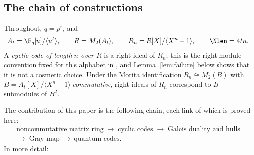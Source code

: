 \subsection{The chain of constructions}

Throughout, $q=p^r$, and
\[
  A_t=\F_q[u]/\langle u^t\rangle,\qquad
  R=M_2(A_t),\qquad
  R_n=R[X]/\langle X^n-1\rangle,\qquad
  \Nlen=4tn .
\]
A \emph{cyclic code of length $n$ over $R$} is a right ideal of $R_n$; this is
the right-module convention fixed for this alphabet in
\cite{Alahmadi2013CyclicM2F2}, and Lemma~\ref{lem:failure} below shows that it
is not a cosmetic choice. Under the Morita identification $R_n\cong M_2(B)$ with
$B=A_t[X]/\langle X^n-1\rangle$ \emph{commutative}, right ideals of $R_n$
correspond to $B$-submodules of $B^2$.

The contribution of this paper is the following chain, each link of which is
proved here:
\[
  \begin{gathered}
    \boxed{\text{noncommutative matrix ring}}
    \;\longrightarrow\;
    \boxed{\text{cyclic codes}}
    \;\longrightarrow\;
    \boxed{\text{Galois duality and hulls}}\\[3pt]
    \longrightarrow\;
    \boxed{\text{Gray map}}
    \;\longrightarrow\;
    \boxed{\text{quantum codes}} .
  \end{gathered}
\]
In more detail:

